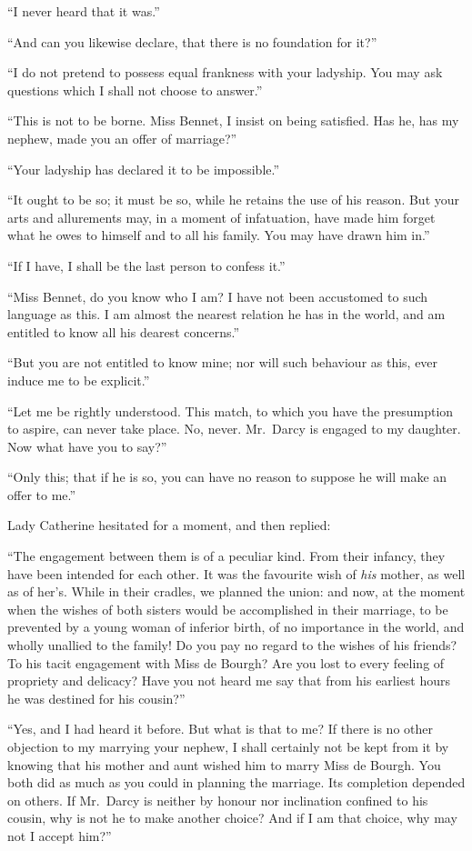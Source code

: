 \documentclass[12pt,english]{book}
\begin{document}
{}``I never heard that it was.''

{}``And can you likewise declare, that there is no foundation for
it?''\ 

{}``I do not pretend to possess equal frankness with your ladyship.
You may ask questions which I shall not choose to answer.''

{}``This is not to be borne. Miss Bennet, I insist on being satisfied.
Has he, has my nephew, made you an offer of marriage?''\ 

{}``Your ladyship has declared it to be impossible.''

{}``It ought to be so; it must be so, while he retains the use of
his reason. But your arts and allurements may, in a moment of infatuation,
have made him forget what he owes to himself and to all his family.
You may have drawn him in.''

{}``If I have, I shall be the last person to confess it.''

{}``Miss Bennet, do you know who I am? I have not been accustomed
to such language as this. I am almost the nearest relation he has
in the world, and am entitled to know all his dearest concerns.''

{}``But you are not entitled to know mine; nor will such behaviour
as this, ever induce me to be explicit.''

{}``Let me be rightly understood. This match, to which you have the
presumption to aspire, can never take place. No, never. Mr.\ Darcy
is engaged to my daughter. Now what have you to say?''\ 

{}``Only this; that if he is so, you can have no reason to suppose
he will make an offer to me.''

Lady Catherine hesitated for a moment, and then replied:

{}``The engagement between them is of a peculiar kind. From their
infancy, they have been intended for each other. It was the favourite
wish of \textit{his} mother, as well as of her's. While in their cradles,
we planned the union: and now, at the moment when the wishes of both
sisters would be accomplished in their marriage, to be prevented by
a young woman of inferior birth, of no importance in the world, and
wholly unallied to the family! Do you pay no regard to the wishes
of his friends? To his tacit engagement with Miss de Bourgh? Are you
lost to every feeling of propriety and delicacy? Have you not heard
me say that from his earliest hours he was destined for his cousin?''\ 

{}``Yes, and I had heard it before. But what is that to me? If there
is no other objection to my marrying your nephew, I shall certainly
not be kept from it by knowing that his mother and aunt wished him
to marry Miss de Bourgh. You both did as much as you could in planning
the marriage. Its completion depended on others. If Mr.\ Darcy is
neither by honour nor inclination confined to his cousin, why is not
he to make another choice? And if I am that choice, why may not I
accept him?''\ 
\end{document}
